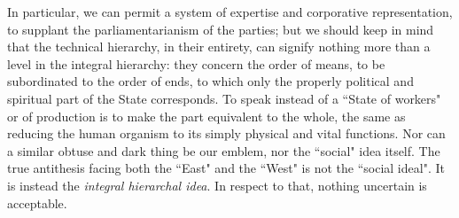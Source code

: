 In particular, we can permit a system of expertise and corporative representation, to supplant the parliamentarianism of the parties; but we should keep in mind that the technical hierarchy, in their entirety, can signify nothing more than a level in the integral hierarchy: they concern the order of means, to be subordinated to the order of ends, to which only the properly political and spiritual part of the State corresponds. To speak instead of a ``State of workers" or of production is to make the part equivalent to the whole, the same as reducing the human organism to its simply physical and vital functions. Nor can a similar obtuse and dark thing be our emblem, nor the ``social" idea itself. The true antithesis facing both the ``East" and the ``West" is not the ``social ideal". It is instead the \emph{integral hierarchal idea}. In respect to that, nothing uncertain is acceptable.

